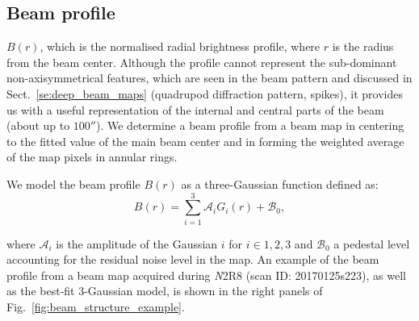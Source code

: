 

\subsection{Beam profile}
\label{se:fullbeam_prof}

 $B(r)$, which is the normalised radial brightness profile,
where $r$ is the radius from the beam center.
Although the profile cannot represent the sub-dominant non-axisymmetrical
features, which are seen in the beam pattern and discussed in
Sect.~\ref{se:deep_beam_maps} (quadrupod diffraction pattern, spikes), it provides us with a useful
representation of the internal and central parts of the beam (about up to
$100''$). We determine a beam profile from a beam map in centering to
the fitted value of the main beam center and in forming the
weighted average of the map pixels in annular rings.

We model the beam profile $B(r)$ as a three-Gaussian function defined as:
\begin{equation}
  B(r) = \sum_{i=1}^{3} \mathcal{A}_i G_i(r) + \mathcal{B}_0,
  \label{eq:3gauss}
\end{equation}

where $\mathcal{A}_i$ is the amplitude of the Gaussian $i$ for $i \in {1, 2, 3}$ and
$\mathcal{B}_0$ a pedestal level accounting for the residual noise
level in the map.
An example of the beam profile from a beam map acquired during {\emph N2R8} (scan ID:
20170125s223), as well as the best-fit 3-Gaussian model, is shown in
the right panels of Fig.~\ref{fig:beam_structure_example}.


